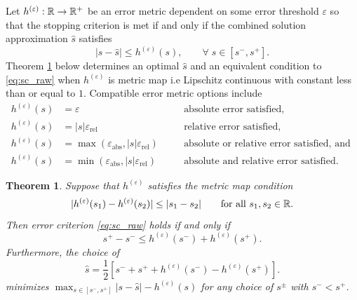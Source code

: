 \documentclass{article}[12pt]
\newtheorem{theorem}{Theorem}[section]
\newcommand{\varepsabs}{\varepsilon_\text{abs}}
\newcommand{\varepsrel}{\varepsilon_\text{rel}}
\begin{document}
Let $h^{(\varepsilon)}: \mathbb{R} \to \mathbb{R}^+$ be an error metric dependent on some error threshold $\varepsilon$ so that the stopping criterion is met if and only if the combined solution approximation $\hat{s}$ satisfies 
\begin{equation}
    \lvert s-\hat{s} \rvert \leq h^{(\varepsilon)}(s), \qquad \forall\; s \in [s^-,s^+].
    \label{eq:sc_raw}
\end{equation}
Theorem \ref{thm:shat_opt} below determines an optimal $\hat{s}$ and an equivalent condition to \eqref{eq:sc_raw} when $h^{(\varepsilon)}$ is metric map i.e Lipschitz continuous with constant less than or equal to $1$. Compatible error metric options include
\begin{subequations}
\begin{align}
    h^{(\varepsilon)}(s) & = \varepsilon \quad &&\text{absolute error satisfied}, \label{eq:h_abs}\\
    h^{(\varepsilon)}(s) & = \lvert s \rvert \varepsrel \quad &&\text{relative error satisfied}, \label{eq:h_rel}\\
    h^{(\varepsilon)}(s) &= \max\left(\varepsabs,\lvert s \rvert \varepsrel \right) \quad &&\text{absolute or relative error satisfied, and } \label{eq:h_abs_or_rel} \\
    h^{(\varepsilon)}(s) &= \min\left(\varepsabs,\lvert s \rvert \varepsrel \right) \quad &&\text{absolute and relative error satisfied.} \label{eq:h_abs_and_rel}
\end{align}
\end{subequations}
\begin{theorem} \label{thm:shat_opt}
    Suppose that  $h^{(\varepsilon)}$ satisfies the metric map condition
    $$\lvert h^{(\varepsilon)}(s_1) - h^{(\varepsilon)}(s_2) \rvert \leq \lvert s_1 - s_2 \rvert \qquad \text{for all } s_1,s_2 \in \mathbb{R}.$$
    Then error criterion  \eqref{eq:sc_raw} holds if and only if 
    \begin{equation}
        s^+-s^- \leq h^{(\varepsilon)}(s^-)+h^{(\varepsilon)}(s^+).
        \label{eq:sc}
    \end{equation}
    Furthermore, the choice of 
    \begin{equation}
        \hat{s} = \frac{1}{2}\left[s^-+s^++h^{(\varepsilon)}(s^-)-h^{(\varepsilon)}(s^+)\right].
        \label{eq:shat_opt}
    \end{equation}
    minimizes $\max_{s \in [s^-,s^+]} \lvert s - \hat{s} \rvert -h^{(\varepsilon)}(s)$ for any choice of $s^{\pm}$ with $s^- < s^+$.
\end{theorem}
\end{document}
